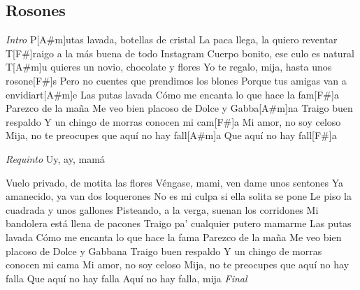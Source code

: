 \subsection{Rosones}
\noindent

\vspace{1cm}

\begin{guitar}
	\begin{multicols}{2}
		\textit{Intro}
		P[A#m]utas lavada, botellas de cristal
	La paca llega, la quiero reventar
	T[F#]raigo a la más buena de todo Instagram
	Cuerpo bonito, ese culo es natural
	T[A#m]u quieres un novio, chocolate y flores
	Yo te regalo, mija, hasta unos rosone[F#]s
	Pero no cuentes que prendimos los blones
	Porque tus amigas van a envidiart[A#m]e
	Las putas lavada
	Cómo me encanta lo que hace la fam[F#]a
	Parezco de la maña
	Me veo bien placoso de Dolce y Gabba[A#m]na
	Traigo buen respaldo
	Y un chingo de morras conocen mi cam[F#]a
	Mi amor, no soy celoso
	Mija, no te preocupes que aquí no hay fall[A#m]a
	Que aquí no hay fall[F#]a

	\par
	\textit{Requinto}
	Uy, ay, mamá
	\par
	Vuelo privado, de motita las flores
	Véngase, mami, ven dame unos sentones
	Ya amanecido, ya van dos loquerones
	No es mi culpa si ella solita se pone
	Le piso la cuadrada y unos gallones
	Pisteando, a la verga, suenan los corridones
	Mi bandolera está llena de pacones
	Traigo pa' cualquier putero mamarme
	Las putas lavada
	Cómo me encanta lo que hace la fama
	Parezco de la maña
	Me veo bien placoso de Dolce y Gabbana
	Traigo buen respaldo
	Y un chingo de morras conocen mi cama
	Mi amor, no soy celoso
	Mija, no te preocupes que aquí no hay falla
	Que aquí no hay falla
	Aquí no hay falla, mija
		\textit{Final}
	\end{multicols}
\end{guitar}
